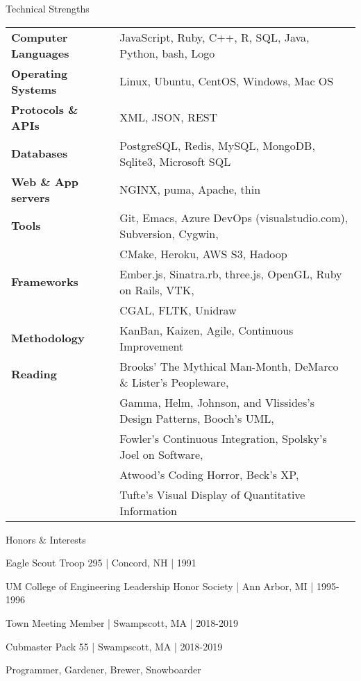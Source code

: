 \documentclass{resume}
\begin{document}
\begin{rSection}{Technical Strengths}
\begin{tabular}{ @{} >{\bfseries}l @{\hspace{6ex}} l }
Computer Languages & JavaScript, Ruby, C++, R, SQL, Java, Python, bash, Logo \\
Operating Systems & Linux, Ubuntu, CentOS, Windows, Mac OS \\
Protocols \& APIs & XML, JSON, REST \\
Databases & PostgreSQL, Redis, MySQL, MongoDB, Sqlite3, Microsoft SQL \\
Web \& App servers & NGINX, puma, Apache, thin \\
Tools & Git, Emacs, Azure DevOps (visualstudio.com), Subversion, Cygwin, \\
 & CMake, Heroku, AWS S3,  Hadoop \\
Frameworks & Ember.js, Sinatra.rb, three.js, OpenGL, Ruby on Rails, VTK, \\
 & CGAL, FLTK, Unidraw \\
Methodology & KanBan, Kaizen, Agile, Continuous Improvement \\
Reading & Brooks' The Mythical Man-Month, DeMarco \& Lister's Peopleware, \\
 & Gamma, Helm, Johnson, and Vlissides's Design Patterns, Booch's UML, \\
 & Fowler's Continuous Integration, Spolsky's Joel on Software, \\
 & Atwood's Coding Horror, Beck's XP, \\
 & Tufte's Visual Display of Quantitative Information
\end{tabular}
\end{rSection}

\begin{rSection}{Honors \& Interests}
\item Eagle Scout Troop 295 | Concord, NH | 1991
\item UM College of Engineering Leadership Honor Society | Ann Arbor, MI | 1995-1996
\item Town Meeting Member | Swampscott, MA | 2018-2019 
\item Cubmaster Pack 55 | Swampscott, MA | 2018-2019 
\item Programmer, Gardener, Brewer, Snowboarder
\end{rSection}
\end{document}
